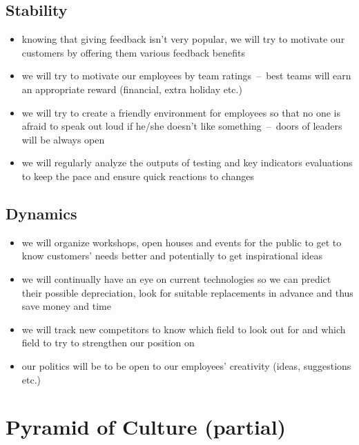 \documentclass[11pt,a4paper]{article}
\begin{document}
    \subsection{Stability}
    \begin{itemize}
        \item knowing that giving feedback isn’t very popular, we will try to motivate our customers by offering them various feedback benefits

        \item we will try to motivate our employees by team ratings~--~best teams will earn an appropriate reward (financial, extra holiday etc.)

        \item we will try to create a friendly environment for employees so that no one is afraid to speak out loud if he/she doesn’t like something~--~doors of leaders will be always open

        \item we will regularly analyze the outputs of testing and key indicators evaluations to keep the pace and ensure quick reactions to changes
    \end{itemize}

    \subsection{Dynamics}
    \begin{itemize}
        \item we will organize workshops, open houses and events for the public to get to know customers’ needs better and potentially to get inspirational ideas

        \item we will continually have an eye on current technologies so we can predict their possible depreciation, look for suitable replacements in advance and thus save money and time

        \item we will track new competitors to know which field to look out for and which field to try to strengthen our position on

        \item our politics will be to be open to our employees’ creativity (ideas, suggestions etc.)
    \end{itemize}

\newpage

\section{Pyramid of Culture (partial)}
\end{document}
